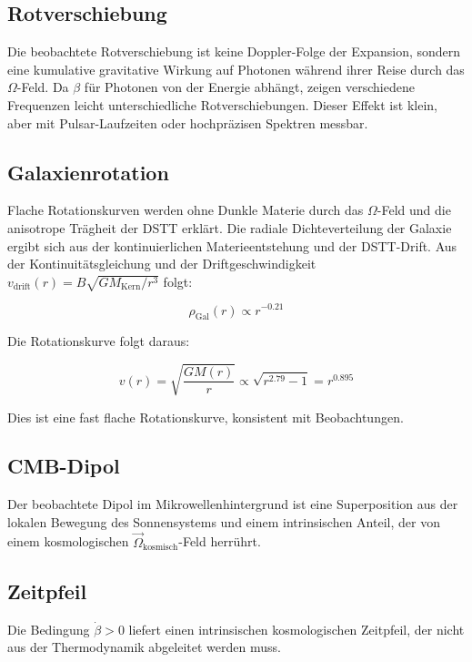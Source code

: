 \documentclass[12pt,a4paper]{article}
\begin{document}
\subsection{Rotverschiebung}

Die beobachtete Rotverschiebung ist keine Doppler-Folge der Expansion, sondern eine kumulative gravitative Wirkung auf Photonen während ihrer Reise durch das $\Omega$-Feld. Da $\beta$ für Photonen von der Energie abhängt, zeigen verschiedene Frequenzen leicht unterschiedliche Rotverschiebungen. Dieser Effekt ist klein, aber mit Pulsar-Laufzeiten oder hochpräzisen Spektren messbar.

\subsection{Galaxienrotation}

Flache Rotationskurven werden ohne Dunkle Materie durch das $\Omega$-Feld und die anisotrope Trägheit der DSTT erklärt. Die radiale Dichteverteilung der Galaxie ergibt sich aus der kontinuierlichen Materieentstehung und der DSTT-Drift. Aus der Kontinuitätsgleichung und der Driftgeschwindigkeit $v_{\text{drift}}(r) = B \sqrt{GM_{\text{Kern}}/r^3}$ folgt:

\begin{equation}
\rho_{\text{Gal}}(r) \propto r^{-0.21}
\end{equation}

Die Rotationskurve folgt daraus:

\begin{equation}
v(r) = \sqrt{\frac{GM(r)}{r}} \propto \sqrt{r^{2.79}-1} = r^{0.895}
\end{equation}

Dies ist eine fast flache Rotationskurve, konsistent mit Beobachtungen.

\subsection{CMB-Dipol}

Der beobachtete Dipol im Mikrowellenhintergrund ist eine Superposition aus der lokalen Bewegung des Sonnensystems und einem intrinsischen Anteil, der von einem kosmologischen $\vec{\Omega}_{\text{kosmisch}}$-Feld herrührt.

\subsection{Zeitpfeil}

Die Bedingung $\dot{\beta} > 0$ liefert einen intrinsischen kosmologischen Zeitpfeil, der nicht aus der Thermodynamik abgeleitet werden muss.
\end{document}
